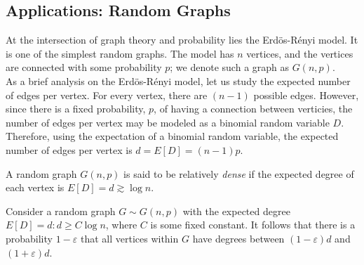 
\newcommand{\erdosrenyi}{Erd\"{o}s-R\'{e}nyi }

\subsection{Applications: Random Graphs}

At the intersection of graph theory and probability lies the Erd\"{o}s-R\'{e}nyi model. It is one of the simplest random graphs. The model has $n$ vertices, and the vertices are connected with some probability $p$; we denote such a graph as $G(n, p).$ \\ 

As a brief analysis on the \erdosrenyi model, let us study the expected number of edges per vertex. For every vertex, there are $(n-1)$ possible edges. However, since there is a fixed probability, $p$, of having a connection between verticies, the number of edges per vertex may be modeled as a binomial random variable $D$. Therefore, using the expectation of a binomial random variable, the expected number of edges per vertex is $d = E[D] = (n-1)p$. \\ 

\begin{tcolorbox}
\begin{definition}
A random graph $G(n, p)$ is said to be relatively \textit{dense} if the expected degree of each vertex is $E[D]= d \gtrsim \log{n}. $
\end{definition}
\end{tcolorbox}


\begin{tcolorbox}
\begin{proposition}
Consider a random graph $G\sim G(n, p)$ with the expected degree $E[D] = d: d\geq C\log{n}$, where $C$ is some fixed constant. It follows that there is a probability $1-\varepsilon$ that all vertices within $G$ have degrees between $(1-\varepsilon) d$ and $(1+\varepsilon) d$. 
\end{proposition}
\end{tcolorbox}


